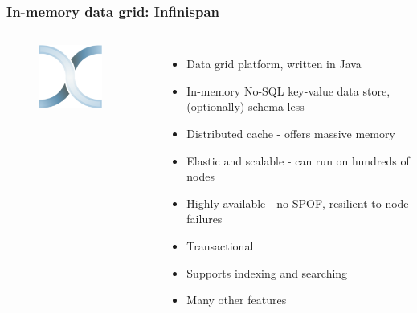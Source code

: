 \documentclass[10pt,utf8]{beamer}
\begin{document}
\begin{frame}
	\frametitle{In-memory data grid: Infinispan}
	\begin{columns}
		\begin{figure}
			\centering
			\includegraphics[width=3cm]{./img/infinispan.eps}
		\end{figure}
		\centering
		\vspace{0.3cm}
		\textbf{}
		\begin{itemize}
			\item Data grid platform, written in Java
			\item In-memory No-SQL key-value data store, (optionally) schema-less
			\item Distributed cache - offers massive memory
			\item Elastic and scalable - can run on hundreds of nodes
			\item Highly available - no SPOF, resilient to node failures
			\item Transactional
			\item Supports indexing and searching
			\item Many other features
		\end{itemize}
	\end{columns}
\end{frame}
\end{document}
